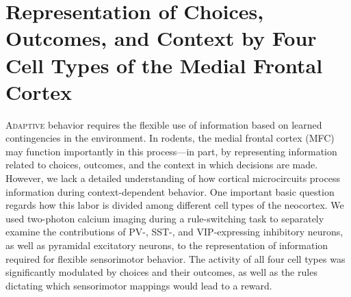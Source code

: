\chapter{Representation of Choices, Outcomes, and Context by Four Cell Types of the Medial Frontal Cortex}
\label{CellTypes_paper}


\lettrine[lines=3,slope=4pt,findent=-3pt]{A}{daptive} behavior requires the flexible use of information based on learned contingencies in the environment. In rodents, the medial frontal cortex (MFC) may function importantly in this process---in part, by representing information related to choices, outcomes, and the context in which decisions are made. However, we lack a detailed understanding of how cortical microcircuits process information during context-dependent behavior. One important basic question regards how this labor is divided among different cell types of the neocortex. We used two-photon calcium imaging during a rule-switching task to separately examine the contributions of PV-, SST-, and VIP-expressing inhibitory neurons, as well as pyramidal excitatory neurons, to the representation of information required for flexible sensorimotor behavior. The activity of all four cell types was significantly modulated by choices and their outcomes, as well as the rules dictating which sensorimotor mappings would lead to a reward.

\newpage


\newpage


\newpage








